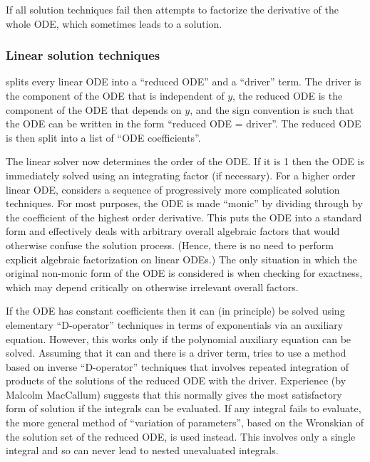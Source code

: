If all solution techniques fail then  attempts to
factorize the derivative of the whole ODE, which sometimes leads to a
solution.


\subsubsection{Linear solution techniques}

 splits every linear ODE into a ``reduced ODE'' and a
``driver'' term.  The driver is the component of the ODE that is
independent of $y$, the reduced ODE is the component of the ODE that
depends on $y$, and the sign convention is such that the ODE can be
written in the form ``reduced ODE = driver''.  The reduced ODE is then
split into a list of ``ODE coefficients''.

The linear solver now determines the order of the ODE\@.  If it is 1
then the ODE is immediately solved using an integrating factor (if
necessary).  For a higher order linear ODE,  considers a
sequence of progressively more complicated solution techniques.  For
most purposes, the ODE is made ``monic'' by dividing through by the
coefficient of the highest order derivative.  This puts the ODE into a
standard form and effectively deals with arbitrary overall algebraic
factors that would otherwise confuse the solution process.  (Hence,
there is no need to perform explicit algebraic factorization on linear
ODEs.)  The only situation in which the original non-monic form of the
ODE is considered is when checking for exactness, which may depend
critically on otherwise irrelevant overall factors.

If the ODE has constant coefficients then it can (in principle) be
solved using elementary ``D-operator'' techniques in terms of
exponentials via an auxiliary equation.  However, this works only if
the polynomial auxiliary equation can be solved.  Assuming that it can
and there is a driver term,  tries to use a method based
on inverse ``D-operator'' techniques that involves repeated
integration of products of the solutions of the reduced ODE with the
driver.  Experience (by Malcolm MacCallum) suggests that this normally
gives the most satisfactory form of solution if the integrals can be
evaluated.  If any integral fails to evaluate, the more general method
of ``variation of parameters'', based on the Wronskian of the solution
set of the reduced ODE, is used instead.  This involves only a single
integral and so can never lead to nested unevaluated integrals.

